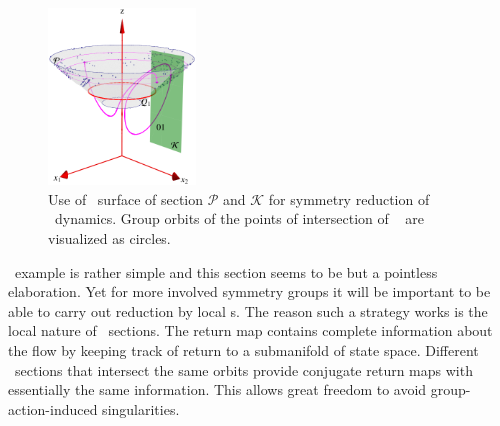 \begin{figure}[ht]
\begin{center}
  \includegraphics[width=0.35\textwidth]{../figs/CLEmartini}
\end{center}
\caption{
Use of \Poincare\ surface of section $\mathcal{P}$ and
{\slice} $\mathcal{K}$ for symmetry reduction of \cLe\
dynamics. Group orbits of the points of intersection of \rpo\
 are visualized as circles.
    }
\label{fig:CLEmartini}
\end{figure}

\CLe\ example is rather simple and this section seems to be but a pointless elaboration.
Yet for more involved symmetry groups it will be important to be able to
carry out reduction by local {\slice s}. The reason such a strategy works
is the local nature of \Poincare\ sections. The return map contains complete
information about the flow by keeping track of return to a submanifold of state space.
Different \Poincare\ sections that intersect the same orbits provide conjugate return
maps with essentially the same information. This allows great freedom to avoid group-action-induced
singularities.
